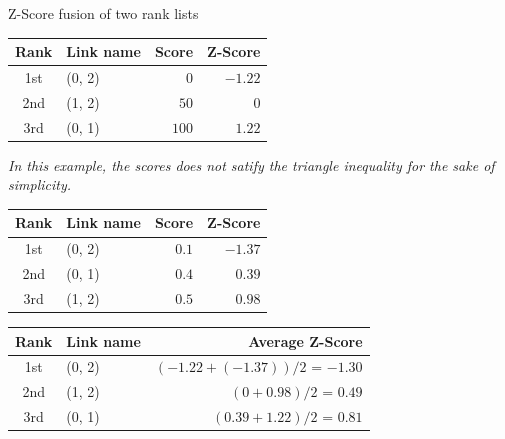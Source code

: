 \begin{example}
  \caption{Z-Score fusion of two rank lists}
  \label{ex:z_score_fusion}

  \begin{subexample}{\linewidth}
    \centering
    \begin{tabular}{c l r r}
      \toprule
      Rank & Link name & Score & Z-Score \\
      \midrule
      1st & (0, 2) & $0$ & $-1.22$ \\
      2nd & (1, 2) & $50$ & $0$ \\
      3rd & (0, 1) & $100$ & $1.22$ \\
      \bottomrule
    \end{tabular}
  \end{subexample}

  \vspace{0.5cm}

  \textit{In this example, the scores does not satify the triangle inequality for the sake of simplicity.}

  \vspace{0.5cm}

  \begin{subexample}{\linewidth}
    \centering
    \begin{tabular}{c l r r}
      \toprule
      Rank & Link name & Score & Z-Score \\
      \midrule
      1st & (0, 2) & $0.1$ & $-1.37$ \\
      2nd & (0, 1) & $0.4$ & $0.39$ \\
      3rd & (1, 2) & $0.5$ & $0.98$ \\
      \bottomrule
    \end{tabular}
  \end{subexample}

  \vspace{0.5cm}

  \begin{subexample}{\linewidth}
    \centering
    \begin{tabular}{c l r}
      \toprule
      Rank & Link name & Average Z-Score \\
      \midrule
      1st & (0, 2) & $(-1.22 + (-1.37)) / 2$ = $-1.30$ \\
      2nd & (1, 2) & $(0 + 0.98) / 2$ = $0.49$ \\
      3rd & (0, 1) & $(0.39 + 1.22) / 2$ = $0.81$ \\
      \bottomrule
    \end{tabular}
  \end{subexample}

\end{example}

